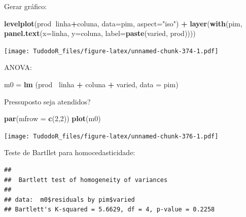 \documentclass[
]{book}
\newenvironment{Shaded}{\begin{snugshade}}{\end{snugshade}}
\newcommand{\DataTypeTok}[1]{\textcolor[rgb]{0.13,0.29,0.53}{#1}}
\newcommand{\DecValTok}[1]{\textcolor[rgb]{0.00,0.00,0.81}{#1}}
\newcommand{\KeywordTok}[1]{\textcolor[rgb]{0.13,0.29,0.53}{\textbf{#1}}}
\newcommand{\NormalTok}[1]{#1}
\newcommand{\OperatorTok}[1]{\textcolor[rgb]{0.81,0.36,0.00}{\textbf{#1}}}
\newcommand{\StringTok}[1]{\textcolor[rgb]{0.31,0.60,0.02}{#1}}
\begin{document}
Gerar gráfico:

\begin{Shaded}
\begin{Highlighting}[]
\KeywordTok{levelplot}\NormalTok{(prod}\OperatorTok{~}\NormalTok{linha}\OperatorTok{+}\NormalTok{coluna, }\DataTypeTok{data=}\NormalTok{pim, }\DataTypeTok{aspect=}\StringTok{"iso"}\NormalTok{) }\OperatorTok{+}\StringTok{ }
\StringTok{  }\KeywordTok{layer}\NormalTok{(}\KeywordTok{with}\NormalTok{(pim, }\KeywordTok{panel.text}\NormalTok{(}\DataTypeTok{x=}\NormalTok{linha, }\DataTypeTok{y=}\NormalTok{coluna, }\DataTypeTok{label=}\KeywordTok{paste}\NormalTok{(varied, prod))))}
\end{Highlighting}
\end{Shaded}

\texttt{[image: TudodoR\_files/figure-latex/unnamed-chunk-374-1.pdf]}

ANOVA:

\begin{Shaded}
\begin{Highlighting}[]
\NormalTok{m0 =}\StringTok{ }\KeywordTok{lm}\NormalTok{ (prod }\OperatorTok{~}\NormalTok{linha }\OperatorTok{+}\StringTok{ }\NormalTok{coluna }\OperatorTok{+}\StringTok{ }\NormalTok{varied, }\DataTypeTok{data =}\NormalTok{ pim)}
\end{Highlighting}
\end{Shaded}

Pressuposto seja atendidos?

\begin{Shaded}
\begin{Highlighting}[]
\KeywordTok{par}\NormalTok{(}\DataTypeTok{mfrow =} \KeywordTok{c}\NormalTok{(}\DecValTok{2}\NormalTok{,}\DecValTok{2}\NormalTok{)) }
\KeywordTok{plot}\NormalTok{(m0)}
\end{Highlighting}
\end{Shaded}

\texttt{[image: TudodoR\_files/figure-latex/unnamed-chunk-376-1.pdf]}

Teste de Bartllet para homocedasticidade:

\begin{Shaded}
\end{Shaded}

\begin{verbatim}
## 
##  Bartlett test of homogeneity of variances
## 
## data:  m0$residuals by pim$varied
## Bartlett's K-squared = 5.6629, df = 4, p-value = 0.2258
\end{verbatim}
\end{document}
